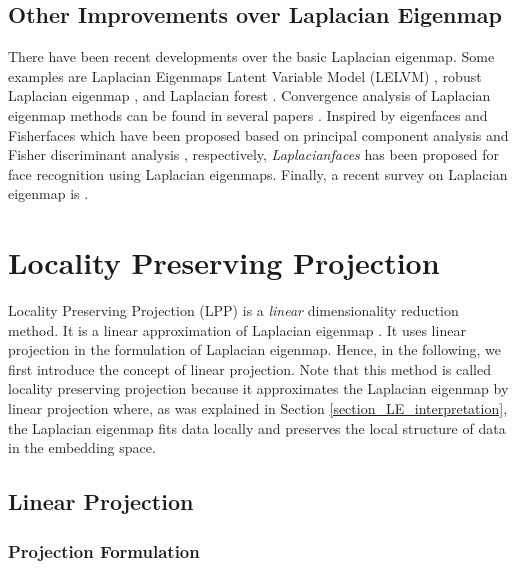 \documentclass[lang=cn,10pt]{gorgeousnbook}
\numberwithin{equation}{section}%
\numberwithin{figure}{section}%
\begin{document}
\subsection{Other Improvements over Laplacian Eigenmap}

There have been recent developments over the basic Laplacian eigenmap. Some examples are Laplacian Eigenmaps Latent Variable Model (LELVM) \cite{carreira2007laplacian}, robust Laplacian eigenmap \cite{roychowdhury2009robust}, and Laplacian forest \cite{lombaert2014laplacian}.
Convergence analysis of Laplacian eigenmap methods can be found in several papers \cite{belkin2006convergence,singer2006graph}. 
Inspired by eigenfaces \cite{turk1991eigenfaces} and Fisherfaces \cite{belhumeur1997eigenfaces} which have been proposed based on principal component analysis \cite{ghojogh2019unsupervised} and Fisher discriminant analysis \cite{ghojogh2019fisher}, respectively, \textit{Laplacianfaces} \cite{he2005face} has been proposed for face recognition using Laplacian eigenmaps. 
Finally, a recent survey on Laplacian eigenmap is \cite{li2019survey,wiskott2019laplacian}.



\section{Locality Preserving Projection}\label{section_Locality_Preserving_Projection}

Locality Preserving Projection (LPP) \cite{he2004locality} is a \textit{linear} dimensionality reduction method. It is a linear approximation of Laplacian eigenmap \cite{belkin2001laplacian,belkin2003laplacian}. It uses linear projection in the formulation of Laplacian eigenmap. Hence, in the following, we first introduce the concept of linear projection. 
Note that this method is called locality preserving projection because it approximates the Laplacian eigenmap by linear projection where, as was explained in Section \ref{section_LE_interpretation}, the Laplacian eigenmap fits data locally and preserves the local structure of data in the embedding space.

\subsection{Linear Projection}

\subsubsection{Projection Formulation}
\end{document}
